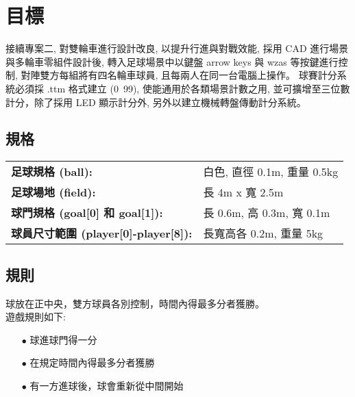 \chapter{目標}
接續專案二, 對雙輪車進行設計改良, 以提升行進與對戰效能, 採用 CAD 進行場景與多輪車零組件設計後, 轉入足球場景中以鍵盤 arrow keys 與 wzas 等按鍵進行控制, 對陣雙方每組將有四名輪車球員, 且每兩人在同一台電腦上操作。
球賽計分系統必須採 .ttm 格式建立 (0~99), 使能通用於各類場景計數之用, 並可擴增至三位數計分，除了採用 LED 顯示計分外, 另外以建立機械轉盤傳動計分系統。

\section{規格}
\begin{tabular}{p{8cm}p{10cm}}
  \textbf{足球規格 (ball):} & 白色, 直徑 0.1m, 重量 0.5kg \\
  \textbf{足球場地 (field):} & 長 4m x 寬 2.5m \\
  \textbf{球門規格 (goal[0] 和 goal[1]):} & 長 0.6m, 高 0.3m, 寬 0.1m \\
  \textbf{球員尺寸範圍 (player[0]-player[8]):} & 長寬高各 0.2m, 重量 5kg \\
\end{tabular}

\section{規則}
球放在正中央，雙方球員各別控制，時間內得最多分者獲勝。 \\
遊戲規則如下:
\begin{itemize}
  \item[$\bullet$] 球進球門得一分
  \item[$\bullet$] 在規定時間內得最多分者獲勝
  \item[$\bullet$] 有一方進球後，球會重新從中間開始
\end{itemize}
